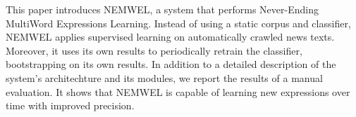 This paper introduces NEMWEL, a system that performs Never-Ending MultiWord Expressions Learning. Instead of using a static corpus and classifier, NEMWEL applies supervised learning on automatically crawled news texts. Moreover, it uses its own results to periodically retrain the classifier, bootstrapping on its own results. In addition to a detailed description of the system's architechture and its modules, we report the results of a manual evaluation. It shows that NEMWEL is capable of learning new expressions over time with improved precision.
